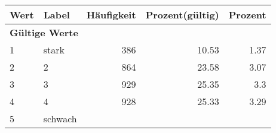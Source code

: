      \begin{longtable}{lXrrr}
     \toprule
     \textbf{Wert} & \textbf{Label} & \textbf{Häufigkeit} & \textbf{Prozent(gültig)} & \textbf{Prozent} \\
     \endhead
     \midrule
     \multicolumn{5}{l}{\textbf{Gültige Werte}}\\

     1 &
     \multicolumn{1}{X}{ stark   } &


       \num{386} &
       \num[round-mode=places,round-precision=2]{10,53} &
         \num[round-mode=places,round-precision=2]{1,37} \\

     2 &
     \multicolumn{1}{X}{ 2   } &


       \num{864} &
       \num[round-mode=places,round-precision=2]{23,58} &
         \num[round-mode=places,round-precision=2]{3,07} \\

     3 &
     \multicolumn{1}{X}{ 3   } &


       \num{929} &
       \num[round-mode=places,round-precision=2]{25,35} &
         \num[round-mode=places,round-precision=2]{3,3} \\

     4 &
     \multicolumn{1}{X}{ 4   } &


       \num{928} &
       \num[round-mode=places,round-precision=2]{25,33} &
         \num[round-mode=places,round-precision=2]{3,29} \\

     5 &
     \multicolumn{1}{X}{ schwach   } &



\end{longtable}
